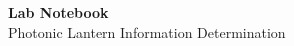 \begin{titlepage}
    \begin{center}
    {\fontsize{40}{48}\selectfont \bfseries Lab Notebook}
    \\\vspace{20pt}
    {\LARGE Photonic Lantern Information Determination} \\
    \vspace{20pt}
    \textbf{}
    \vspace{8pt}
    \end{center}
    
\end{titlepage}
